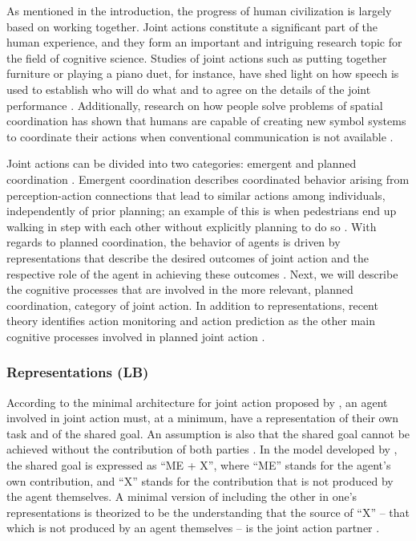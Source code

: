 \documentclass[10pt,a4paper,onecolumn]{article}
\begin{document}
As mentioned in the introduction, the progress of human civilization is largely based on working together. Joint actions constitute a significant part of the human experience, and they form an important and intriguing research topic for the field of cognitive science. Studies of joint actions such as putting together furniture or playing a piano duet, for instance, have shed light on how speech is used to establish who will do what and to agree on the details of the joint performance \autocite{clarkCoordinatingEachOther2005}. Additionally, research on how people solve problems of spatial coordination has shown that humans are capable of creating new symbol systems to coordinate their actions when conventional communication is not available \autocite{galantucciExperimentalSemioticsNew2009}.

Joint actions can be divided into two categories: emergent and planned coordination \autocite{knoblichPsychologicalResearchJoint2011}. Emergent coordination describes coordinated behavior arising from perception-action connections that lead to similar actions among individuals, independently of prior planning; an example of this is when pedestrians end up walking in step with each other without explicitly planning to do so \autocite{knoblichPsychologicalResearchJoint2011}. With regards to planned coordination, the behavior of agents is driven by representations that describe the desired outcomes of joint action and the respective role of the agent in achieving these outcomes \autocite{knoblichPsychologicalResearchJoint2011}. Next, we will describe the cognitive processes that are involved in the more relevant, planned coordination, category of joint action. In addition to representations, recent theory identifies action monitoring and action prediction as the other main cognitive processes involved in planned joint action \autocite{loehrMonitoringIndividualJoint2013,sebanzJointActionBodies2006,vesperMinimalArchitectureJoint2010}.

\hypertarget{representations-lb}{%
\subsubsection{Representations (LB)}\label{representations-lb}}

According to the minimal architecture for joint action proposed by \textcite{vesperMinimalArchitectureJoint2010}, an agent involved in joint action must, at a minimum, have a representation of their own task and of the shared goal. An assumption is also that the shared goal cannot be achieved without the contribution of both parties \autocite{vesperMinimalArchitectureJoint2010}. In the model developed by \textcite{vesperMinimalArchitectureJoint2010}, the shared goal is expressed as ``ME + X'', where ``ME'' stands for the agent's own contribution, and ``X'' stands for the contribution that is not produced by the agent themselves. A minimal version of including the other in one's representations is theorized to be the understanding that the source of ``X'' -- that which is not produced by an agent themselves -- is the joint action partner \autocite{loehrSoundYouMe2016,vesperMinimalArchitectureJoint2010}.
\end{document}

